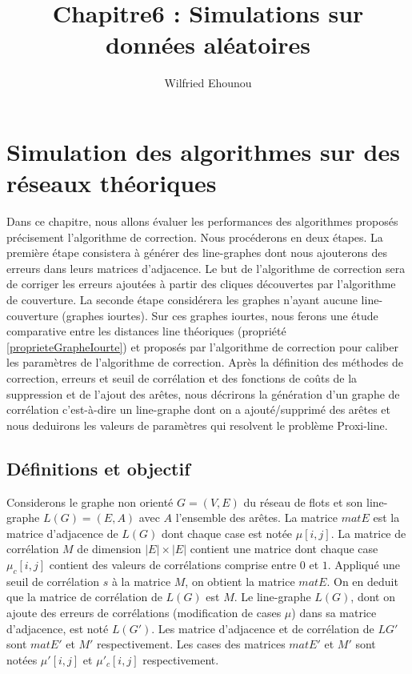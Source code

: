 \documentclass[onecolumn, 12pt]{book}
\title{Chapitre6 : Simulations sur donn\'ees al\'eatoires}
\author{Wilfried Ehounou}
\date{\oldstylenums{\today}}
\begin{document}
\maketitle
\tableofcontents

\chapter{Simulation des algorithmes sur des r\'eseaux th\'eoriques}
Dans ce chapitre, nous allons \'evaluer les performances des algorithmes propos\'es pr\'ecisement l'algorithme de correction. Nous proc\'ederons en deux \'etapes. 
La premi\`ere \'etape consistera  \`a g\'en\'erer des line-graphes dont nous ajouterons des erreurs dans leurs matrices d'adjacence. Le but de l'algorithme de correction sera de corriger les erreurs ajout\'ees \`a partir des cliques d\'ecouvertes par l'algorithme de couverture. 
La seconde \'etape consid\'erera les graphes n'ayant aucune line-couverture (graphes iourtes). Sur ces graphes iourtes, nous ferons  une \'etude comparative entre les distances line th\'eoriques (propri\'et\'e \ref{proprieteGrapheIourte}) et propos\'es par l'algorithme de correction pour caliber les param\`etres de l'algorithme de correction. \newline
Apr\`es la d\'efinition des m\'ethodes de correction, erreurs et seuil de corr\'elation et des fonctions de co\^uts de la suppression et de l'ajout des ar\^etes, nous d\'ecrirons la g\'en\'eration d'un graphe de corr\'elation c'est-\`a-dire un line-graphe dont on a ajout\'e/supprim\'e des ar\^etes et nous deduirons les valeurs de param\`etres qui resolvent le probl\`eme Proxi-line. 

\section{D\'efinitions et objectif}
Considerons le graphe non orient\'e $G = (V,E)$ du r\'eseau de flots et son line-graphe $L(G) = (E, A)$ avec $A$ l'ensemble des ar\^etes.
La matrice $matE$ est la matrice d'adjacence de $L(G)$ dont chaque case est not\'ee $\mu[i,j]$.
La matrice de corr\'elation $M$ de dimension $|E| \times |E|$ contient une matrice dont chaque case $\mu_c[i,j]$ contient des valeurs de corr\'elations comprise entre $0$ et $1$. 
Appliqu\'e une seuil de corr\'elation  $s$ \`a la matrice $M$, on obtient la matrice $matE$. On en deduit que la matrice de corr\'elation de $L(G)$ est $M$. \newline
Le line-graphe $L(G)$, dont on ajoute des erreurs de corr\'elations (modification de cases $\mu$) dans sa matrice d'adjacence, est not\'e $L(G')$. Les matrice d'adjacence et de corr\'elation de $LG'$ sont $matE'$ et $M'$ respectivement. Les cases des matrices $matE'$ et $M'$ sont not\'ees  $\mu'[i,j]$ et $\mu'_c[i,j]$ respectivement.
 
\end{document}
